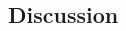 \documentclass[nolinenumbers,preprint2,tighten]{aastex631}
\begin{document}
\begin{CJK*}{UTF8}{gbsn}
\vspace{5mm}
\section{Discussion}\label{sec:discussion}


%







\end{CJK*}
\end{document}
